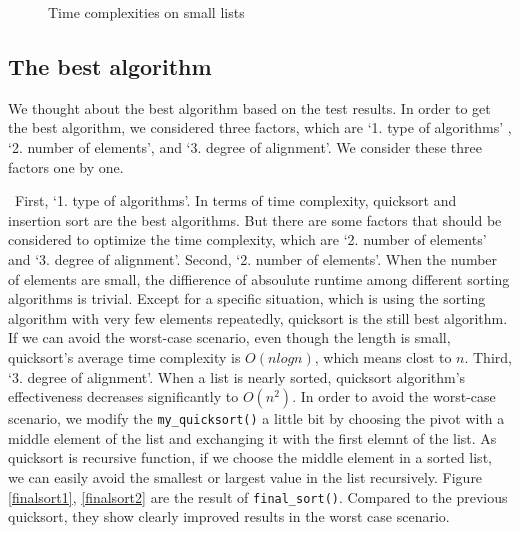 \documentclass[12pt]{article}
\begin{document}
\begin{figure}[hbt!]
  \centering
  \hfill
  \caption{Time complexities on small lists}
\end{figure}

\subsection{The best algorithm}
We thought about the best algorithm based on the test results. In order to get the 
best algorithm, we considered three factors, which are `1. type of algorithms'
, `2. number of elements', and `3. degree of alignment'. We consider these three 
factors one by one. 

~\newline\noindent First, `1. type of algorithms'. In terms of time complexity, quicksort and insertion 
sort are the best algorithms. But there are some factors that should be considered
to optimize the time complexity, which are `2. number of elements' and `3. degree of 
alignment'. Second, `2. number of elements'. When the number of
 elements are small, the diffierence of absoulute runtime among different 
 sorting algorithms is 
trivial. Except for a specific situation, which is using the sorting algorithm with
very few elements repeatedly, quicksort is the still best algorithm. If we can 
avoid the worst-case scenario, even though the length is small, quicksort's average
time complexity is $O(nlogn)$, which means clost to $n$. 
Third, `3. degree of alignment'. When a list is nearly sorted, quicksort algorithm's
effectiveness decreases significantly to $O(n^{2})$. In order to avoid the worst-case 
scenario, we modify the \verb|my_quicksort()| a little bit by choosing the
pivot with a middle element of the list and exchanging it with the first elemnt of 
the list. As quicksort is recursive function, 
if we choose the middle element in a sorted list, we can easily avoid the smallest 
or largest value in the list recursively. Figure \ref{finalsort1}, \ref{finalsort2} 
are the result of \verb|final_sort()|. 
Compared to the previous quicksort, they show clearly improved results in 
the worst case scenario.
\end{document}
